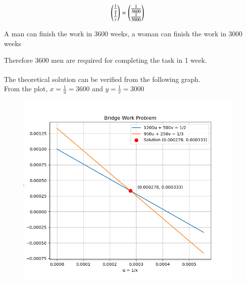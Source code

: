 \documentclass[journal]{IEEEtran}
\begin{document}
\begin{align}
\begin{pmatrix}\frac{1}{x} \\ \frac{1}{y}\end{pmatrix} = \begin{pmatrix}\frac{1}{3600} \\ \frac{1}{3000}\end{pmatrix}
\end{align}

A man can finish the work in 3600 weeks, a woman can finish the work in 3000 weeks

Therefore 3600 men are required for completing the task in 1 week.\\ \\

The theoretical solution can be verified from the following graph. \\
From the plot, $x = \frac{1}{u} = 3600$ and $y = \frac{1}{v} = 3000$ 
\begin{figure}[h!]
    \centering
    \includegraphics[height=0.5\textheight, keepaspectratio]{figs/Figure_1.png}
    \label{figure_1}
\end{figure}
\end{document}
